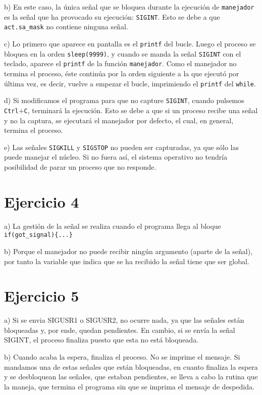 \documentclass{article}
\begin{document}
b) En este caso, la única señal que se bloquea durante la ejecución de \texttt{manejador} es la señal que ha provocado su ejecución: \texttt{SIGINT}. Esto se debe a que \texttt{act.sa\_mask} no contiene ninguna señal.

c) Lo primero que aparece en pantalla es el \texttt{printf} del bucle. Luego el proceso se bloquea en la orden \texttt{sleep(9999)}, y cuando se manda la señal \texttt{SIGINT} con el teclado, aparece el \texttt{printf} de la función \texttt{manejador}. Como el manejador no termina el proceso, éste continúa por la orden siguiente a la que ejecutó por última vez, es decir, vuelve a empezar el bucle, imprimiendo el \texttt{printf} del \texttt{while}.

d) Si modificamos el programa para que no capture \texttt{SIGINT}, cuando pulsemos \texttt{Ctrl}$+$\texttt{C}, terminará la ejecución. Esto se debe a que si un proceso recibe una señal y no la captura, se ejecutará el manejador por defecto, el cual, en general, termina el proceso.

e) Las señales \texttt{SIGKILL} y \texttt{SIGSTOP} no pueden ser capturadas, ya que sólo las puede manejar el núcleo. Si no fuera así, el sistema operativo no tendría posibilidad de parar un proceso que no responde. 

\section*{Ejercicio 4}
a) La gestión de la señal se realiza cuando el programa llega al bloque \texttt{if(got\_signal)\{...\}}

b) Porque el manejador no puede recibir ningún argumento (aparte de la señal), por tanto la variable que indica que se ha recibido la señal tiene que ser global.

\section*{Ejercicio 5}
a) Si se envia SIGUSR1 o SIGUSR2, no ocurre nada, ya que las señales están bloqueadas y, por ende, quedan pendientes. En cambio, si se envía la señal SIGINT, el proceso finaliza puesto que esta no está bloqueada.

b) Cuando acaba la espera, finaliza el proceso. No se imprime el mensaje. Si mandamos una de estas señales que están bloqueadas, en cuanto finaliza la espera y se desbloquean las señales, que estaban pendientes, se lleva a cabo la rutina que la maneja, que termina el programa sin que se imprima el mensaje de despedida.
\end{document}
